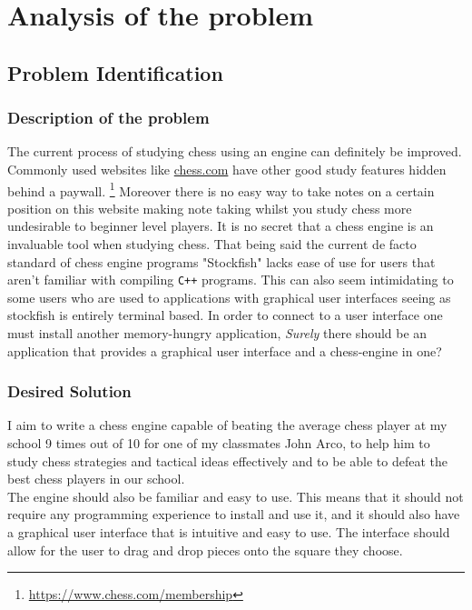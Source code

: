 \pagestyle{fancy}

\chapter{Analysis of the problem}

\section{Problem Identification}
\subsection*{Description of the problem}
The current process of studying chess using an engine can 
definitely be improved. Commonly used websites like
\url{chess.com} have other good study features hidden behind
a paywall. \footnote{\url{https://www.chess.com/membership}}
Moreover there is no easy way to take notes on a certain 
position on this website making note taking whilst you study 
chess more undesirable to beginner level players.
It is no secret that a chess engine is an invaluable tool 
when studying chess. That being said the current de facto
standard of chess engine programs "Stockfish" lacks ease 
of use for users that aren't familiar with compiling \texttt{C++} 
programs. This can also seem intimidating to some users who
are used to applications with graphical user interfaces 
seeing as stockfish is entirely terminal 
based. \cite{stockfish} In order to connect to a user interface
one must install another memory-hungry application, \textit{Surely}
there should be an application that provides a graphical user
interface and a chess-engine in one?

\subsection*{Desired Solution}
I aim to write a chess engine capable of beating the 
average chess player at my school 9 times out of 10 for 
one of my classmates John Arco, to help him to study
chess strategies and tactical ideas effectively and to
be able to defeat the best chess players in our school. \\


The engine should also be familiar and easy to use. This
means that it should not require any programming experience
to install and use it, and it should also have a graphical 
user interface that is intuitive and easy to use. The interface
should allow for the user to drag and drop pieces onto the square 
they choose.\\


